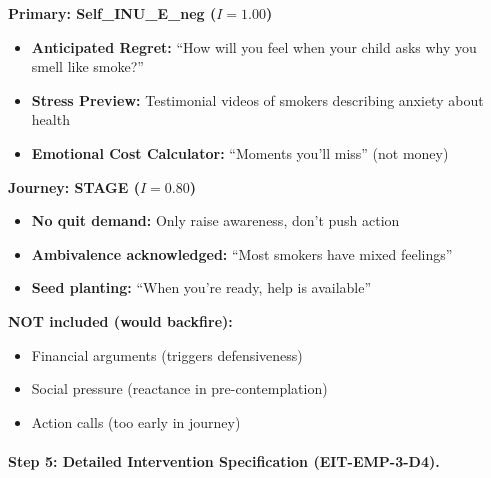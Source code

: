 \begin{tcolorbox}[colback=green!5!white, colframe=green!75!black,
    title=\textbf{Smoking Cessation Intervention Package (Pre-Contemplation)}]

\textbf{Primary: Self\_INU\_E\_neg ($I = 1.00$)}
\begin{itemize}[nosep]
    \item \textbf{Anticipated Regret:} ``How will you feel when your child asks why you smell like smoke?''
    \item \textbf{Stress Preview:} Testimonial videos of smokers describing anxiety about health
    \item \textbf{Emotional Cost Calculator:} ``Moments you'll miss'' (not money)
\end{itemize}

\textbf{Journey: STAGE ($I = 0.80$)}
\begin{itemize}[nosep]
    \item \textbf{No quit demand:} Only raise awareness, don't push action
    \item \textbf{Ambivalence acknowledged:} ``Most smokers have mixed feelings''
    \item \textbf{Seed planting:} ``When you're ready, help is available''
\end{itemize}

\textbf{NOT included (would backfire):}
\begin{itemize}[nosep]
    \item[$\times$] Financial arguments (triggers defensiveness)
    \item[$\times$] Social pressure (reactance in pre-contemplation)
    \item[$\times$] Action calls (too early in journey)
\end{itemize}

\end{tcolorbox}

\paragraph{Step 5: Detailed Intervention Specification (EIT-EMP-3-D4).}

